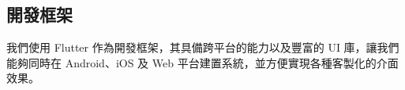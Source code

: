 \subsection{開發框架}

我們使用 Flutter 作為開發框架，其具備跨平台的能力以及豐富的 UI 庫，讓我們能夠同時在 Android、iOS 及 Web 平台建置系統，並方便實現各種客製化的介面效果。
